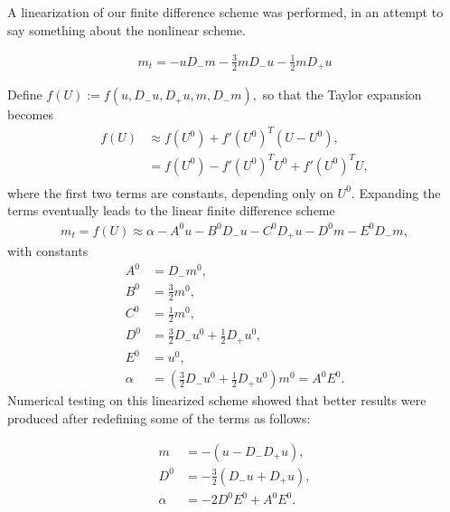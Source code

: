 A linearization of our finite difference scheme was performed, in an attempt to say something about the nonlinear scheme. 

\begin{align*}
m_{t} = -uD_{-}m - \frac{3}{2}mD_{-}u - \frac{1}{2}mD_{+}u
\end{align*} 

Define $f(U) := f(u, D_{-}u, D_{+}u, m, D_{-}m),$ so that the Taylor expansion becomes
\begin{align*}
f(U) &\approx f(U^{0}) + f'(U^{0})^{T}(U-U^{0}),\\
&= f(U^{0}) - f'(U^{0})^{T}U^{0} + f'(U^{0})^{T}U, \\
\end{align*}
where the first two terms are constants, depending only on  $U^{0}$. Expanding the terms eventually leads to the linear finite difference scheme
\begin{align*}
m_{t} = f(U) \approx \alpha - A^{0}u - B^{0}D_{-}u - C^{0}D_{+}u - D^{0}m - E^{0}D_{-}m,
\end{align*}
with constants
\begin{align*}
A^{0} &= D_{-}m^{0}, \\
B^{0} &= \frac{3}{2}m^{0}, \\
C^{0} &= \frac{1}{2}m^{0}, \\
D^{0} &= \frac{3}{2}D_{-}u^{0} + \frac{1}{2}D_{+}u^{0}, \\
E^{0} &= u^{0}, \\
\alpha &= (\frac{3}{2}D_{-}u^{0} + \frac{1}{2}D_{+}u^{0})m^{0} = A^{0}E^{0}.
\end{align*}
Numerical testing on this linearized scheme showed that better results were produced after redefining some of the terms as follows:

\begin{align*}
m &= -(u - D_{-}D_{+}u), \\
D^{0} &= -\frac{3}{2}(D_{-}u + D_{+}u), \\
\alpha &= -2D^{0}E^{0} + A^{0}E^{0}.
\end{align*}